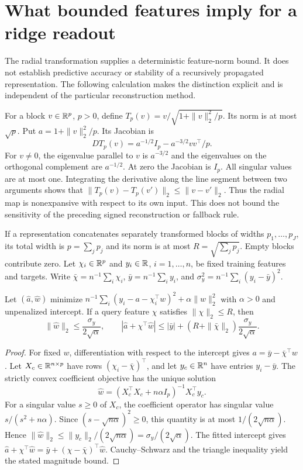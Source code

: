 
\section{What bounded features imply for a ridge readout}\label{supp:bound}
The radial transformation supplies a deterministic feature-norm bound. It does not establish predictive accuracy or stability of a recursively propagated representation. The following calculation makes the distinction explicit and is independent of the particular reconstruction method.

For a block $v\in\mathbb R^p$, $p>0$, define $T_p(v)=v/\sqrt{1+\|v\|_2^2/p}$. Its norm is at most $\sqrt p$. Put $a=1+\|v\|_2^2/p$. Its Jacobian is
\[
 DT_p(v)=a^{-1/2}I_p-a^{-3/2}vv^\top/p.
\]
For $v\ne0$, the eigenvalue parallel to $v$ is $a^{-3/2}$ and the eigenvalues on the orthogonal complement are $a^{-1/2}$. At zero the Jacobian is $I_p$. All singular values are at most one. Integrating the derivative along the line segment between two arguments shows that $\|T_p(v)-T_p(v')\|_2\leq\|v-v'\|_2$. Thus the radial map is nonexpansive with respect to its own input. This does not bound the sensitivity of the preceding signed reconstruction or fallback rule.

If a representation concatenates separately transformed blocks of widths $p_1,\ldots,p_J$, its total width is $p=\sum_jp_j$ and its norm is at most $R=\sqrt{\sum_jp_j}$. Empty blocks contribute zero. Let $\chi_i\in\mathbb R^p$ and $y_i\in\mathbb R$, $i=1,\ldots,n$, be fixed training features and targets. Write $\bar\chi=n^{-1}\sum_i\chi_i$, $\bar y=n^{-1}\sum_i y_i$, and $\sigma_y^2=n^{-1}\sum_i(y_i-\bar y)^2$.

\begin{proposition}
Let $(\widehat a,\widehat w)$ minimize
$n^{-1}\sum_i(y_i-a-\chi_i^\top w)^2+\alpha\|w\|_2^2$ with $\alpha>0$ and unpenalized intercept. If a query feature $\chi$ satisfies $\|\chi\|_2\leq R$, then
\[
 \|\widehat w\|_2\leq\frac{\sigma_y}{2\sqrt\alpha},\qquad
 |\widehat a+\chi^\top\widehat w|
 \leq|\bar y|+(R+\|\bar\chi\|_2)\frac{\sigma_y}{2\sqrt\alpha}.
\]
\end{proposition}
\begin{proof}
For fixed $w$, differentiation with respect to the intercept gives $a=\bar y-\bar\chi^\top w$. Let $X_c\in\mathbb R^{n\times p}$ have rows $(\chi_i-\bar\chi)^\top$, and let $y_c\in\mathbb R^n$ have entries $y_i-\bar y$. The strictly convex coefficient objective has the unique solution
\[
 \widehat w=(X_c^\top X_c+n\alpha I_p)^{-1}X_c^\top y_c.
\]
For a singular value $s\geq0$ of $X_c$, the coefficient operator has singular value $s/(s^2+n\alpha)$. Since $(s-\sqrt{n\alpha})^2\geq0$, this quantity is at most $1/(2\sqrt{n\alpha})$. Hence $\|\widehat w\|_2\leq\|y_c\|_2/(2\sqrt{n\alpha})=\sigma_y/(2\sqrt\alpha)$. The fitted intercept gives
$\widehat a+\chi^\top\widehat w=\bar y+(\chi-\bar\chi)^\top\widehat w$.
Cauchy--Schwarz and the triangle inequality yield the stated magnitude bound.
\end{proof}

